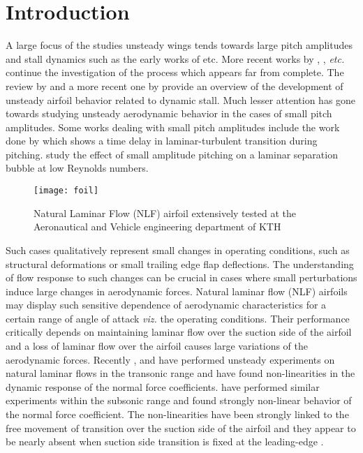 

\section{Introduction}

A large focus of the studies unsteady wings tends towards large pitch amplitudes and stall dynamics such as the early works of \cite{mccroskey81,mccroskey82experimental,mccroskey73,mccroskey76,carr1977} etc. More recent works by \cite{dunne2015}, \cite{rival2010}, \cite{choudhry14} \emph{etc.} continue the investigation of the process which appears far from complete. The review by \cite{mccroskey82} and a more recent one by \cite{coorke15} provide an overview of the development of unsteady airfoil behavior related to dynamic stall. Much lesser attention has gone towards studying unsteady aerodynamic behavior in the cases of small pitch amplitudes. Some works dealing with small pitch amplitudes include the work done by \cite{pascazio96} which shows a time delay in laminar-turbulent transition during pitching. \cite{nati15} study the effect of small amplitude pitching on a laminar separation bubble at low Reynolds numbers. 
\begin{figure}[h]
	\centering
	\texttt{[image: foil]}
	\caption{Natural Laminar Flow (NLF) airfoil extensively tested at the Aeronautical and Vehicle engineering department of KTH \citep{lokatt17,lokattthesis}}
	\label{fig:foil_david}
\end{figure}
Such cases qualitatively represent small changes in operating conditions, such as structural deformations or small trailing edge flap deflections. The understanding of flow response to such changes can be crucial in cases where small perturbations induce large changes in aerodynamic forces. Natural laminar flow (NLF) airfoils may display such sensitive dependence of aerodynamic characteristics for a certain range of angle of attack \emph{viz.} the operating conditions. Their performance critically depends on maintaining laminar flow over the suction side of the airfoil and a loss of laminar flow over the airfoil causes large variations of the aerodynamic forces. Recently \cite{mai11}, and \cite{hebler13} have performed unsteady experiments on natural laminar flows in the transonic range and have found non-linearities in the dynamic response of the normal force coefficients. \cite{lokattthesis} have performed similar experiments within the subsonic range and found strongly non-linear behavior of the normal force coefficient. The non-linearities have been strongly linked to the free movement of transition over the suction side of the airfoil and they appear to be nearly absent when suction side transition is fixed at the leading-edge \citep{mai11,lokattthesis}.

